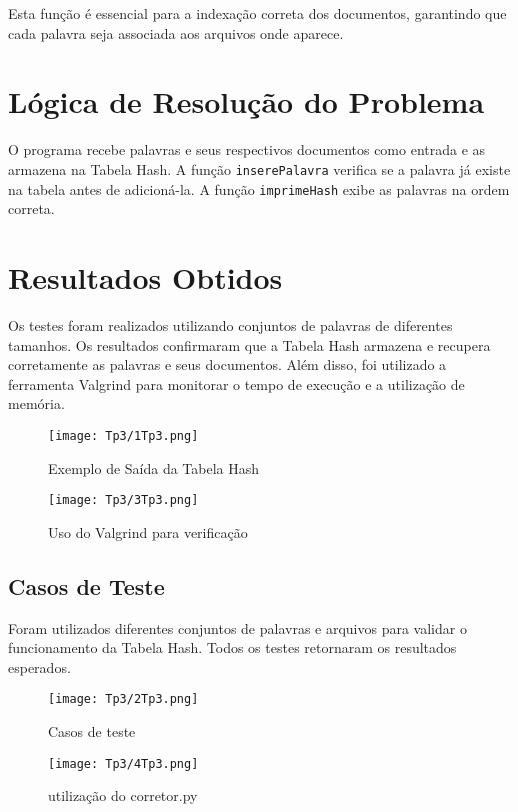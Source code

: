 \documentclass[a4paper,12pt]{article}
\begin{document}
Esta fun\c{c}\~ao \'e essencial para a indexa\c{c}\~ao correta dos documentos, garantindo que cada palavra seja associada aos arquivos onde aparece.

\section{L\'ogica de Resolu\c{c}\~ao do Problema}
O programa recebe palavras e seus respectivos documentos como entrada e as armazena na Tabela Hash. A fun\c{c}\~ao \texttt{inserePalavra} verifica se a palavra j\'a existe na tabela antes de adicion\'a-la. A fun\c{c}\~ao \texttt{imprimeHash} exibe as palavras na ordem correta.

\section{Resultados Obtidos}
Os testes foram realizados utilizando conjuntos de palavras de diferentes tamanhos. Os resultados confirmaram que a Tabela Hash armazena e recupera corretamente as palavras e seus documentos. Além disso, foi utilizado a ferramenta Valgrind
para monitorar o tempo de execução e a utilização de memória.

\begin{figure}[H]
    \centering
    \texttt{[image: Tp3/1Tp3.png]}
    \caption{Exemplo de Sa\'ida da Tabela Hash}
\end{figure}

\begin{figure}[H]
    \centering
    \texttt{[image: Tp3/3Tp3.png]}
    \caption{Uso do Valgrind para verificação}
\end{figure}

\subsection{Casos de Teste}
Foram utilizados diferentes conjuntos de palavras e arquivos para validar o funcionamento da Tabela Hash. Todos os testes retornaram os resultados esperados.

\begin{figure}[H]
    \centering
    \texttt{[image: Tp3/2Tp3.png]}
    \caption{Casos de teste}
\end{figure}

\begin{figure}[H]
    \centering
    \texttt{[image: Tp3/4Tp3.png]}
    \caption{utilização do corretor.py}
\end{figure}
\end{document}

